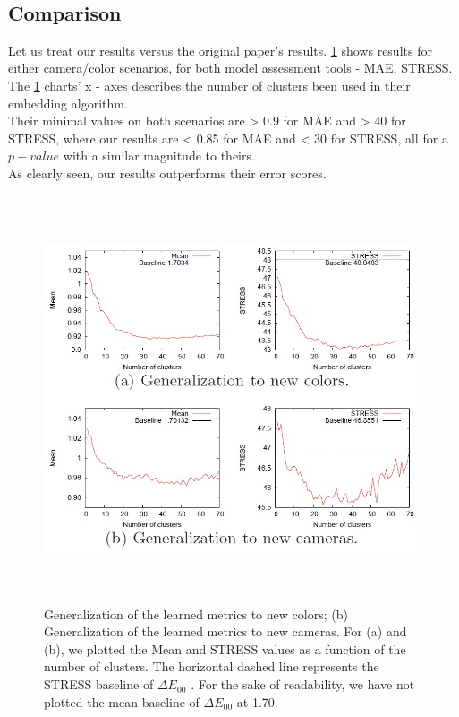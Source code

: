 \\



\subsection{Comparison}
Let us treat our results versus the original paper's results.
\ref{original paper results} shows results for either camera/color scenarios, for both model assessment tools - MAE, STRESS. \\

The \ref{original paper results} charts' x - axes describes the number of clusters been used in their embedding algorithm. \\

Their minimal values on both scenarios are > 0.9 for MAE and > 40 for STRESS, where our results are < 0.85 for MAE and < 30 for STRESS, all for a $p - value$ with a similar magnitude to theirs. \\

As clearly seen, our results outperforms their error scores.


\begin{figure}[h] \label{original paper results}
			\includegraphics[width=\linewidth,height=12cm,keepaspectratio]{Figures/original_paper_results}
			\caption[orig res]
			{Generalization of the learned metrics to new colors; (b) Generalization of
			the learned metrics to new cameras. For (a) and (b), we plotted the Mean and STRESS
			values as a function of the number of clusters. The horizontal dashed line represents
			the STRESS baseline of $\Delta E_{00}$ . For the sake of readability, we have not plotted the
			mean baseline of $\Delta E_{00}$ at 1.70.}
\end{figure}

